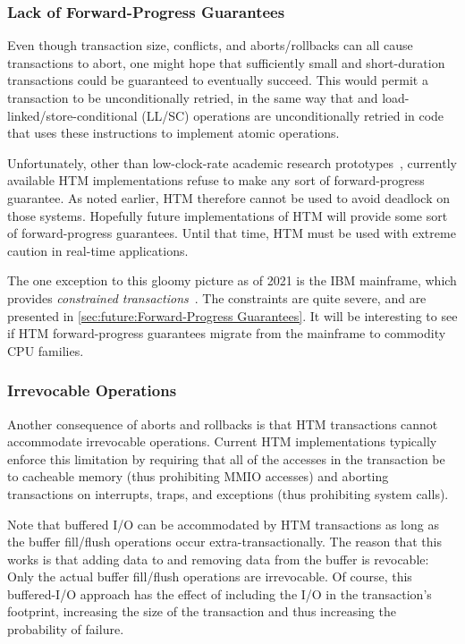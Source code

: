 \subsubsection{Lack of Forward-Progress Guarantees}
\label{sec:future:Lack of Forward-Progress Guarantees}

Even though transaction size, conflicts, and aborts/rollbacks can all
cause transactions to abort, one might hope that sufficiently small and
short-duration transactions could be guaranteed to eventually succeed.
This would permit a transaction to be unconditionally retried, in the
same way that  and load-linked/store-conditional
(LL/SC) operations are unconditionally retried in code that uses these
instructions to implement atomic operations.

Unfortunately, other than low-clock-rate academic research
prototypes~\cite{MartinSchoeberl2010realtimeTM},
currently available HTM implementations refuse to make any
sort of forward-progress guarantee.
As noted earlier, HTM therefore cannot be used to avoid deadlock on
those systems.
Hopefully future implementations of HTM will provide some sort of
forward-progress guarantees.
Until that time, HTM must be used with extreme caution in real-time
applications.

The one exception to this gloomy picture as of 2021 is
the IBM mainframe, which provides
\emph{constrained transactions}~\cite{ChristianJacobi2012MainframeTM}.
The constraints are quite severe, and are presented in
\cref{sec:future:Forward-Progress Guarantees}.
It will be interesting to see if HTM forward-progress guarantees migrate
from the mainframe to commodity CPU families.

\subsubsection{Irrevocable Operations}
\label{sec:future:Irrevocable Operations}

Another consequence of aborts and rollbacks is that HTM transactions
cannot accommodate irrevocable operations.
Current HTM implementations typically enforce this limitation by
requiring that all of the accesses in the transaction be to cacheable
memory (thus prohibiting MMIO accesses) and aborting transactions on
interrupts, traps, and exceptions (thus prohibiting system calls).

Note that buffered I/O can be accommodated by HTM transactions as
long as the buffer fill/flush operations occur extra-transactionally.
The reason that this works is that adding data to and removing data
from the buffer is revocable: Only the actual buffer fill/flush
operations are irrevocable.
Of course, this buffered-I/O approach has the effect of including the I/O
in the transaction's footprint, increasing the size of the transaction
and thus increasing the probability of failure.

